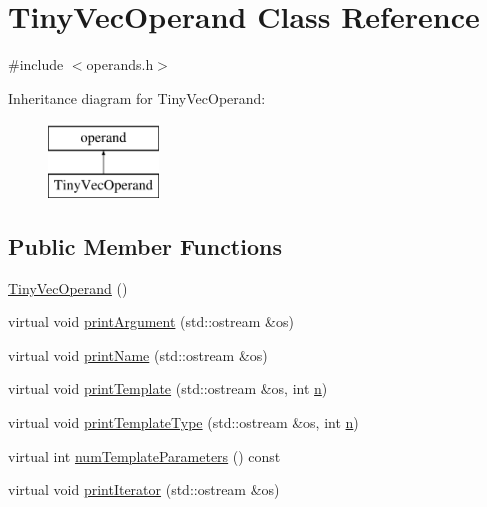 \hypertarget{classTinyVecOperand}{}\section{Tiny\+Vec\+Operand Class Reference}
\label{classTinyVecOperand}


{\ttfamily \#include $<$operands.\+h$>$}

Inheritance diagram for Tiny\+Vec\+Operand\+:\begin{figure}[H]
\begin{center}
\leavevmode
\includegraphics[height=2.000000cm]{classTinyVecOperand}
\end{center}
\end{figure}
\subsection*{Public Member Functions}
\begin{DoxyCompactItemize}
\item 
\hyperlink{classTinyVecOperand_aa486b38bca61434eaea6b1c0a2bb2fba}{Tiny\+Vec\+Operand} ()
\item 
virtual void \hyperlink{classTinyVecOperand_a8b207f9cefdae0ef7324d96a565d52cf}{print\+Argument} (std\+::ostream \&os)
\item 
virtual void \hyperlink{classTinyVecOperand_a86b2787ecac31739ef93ca8333f431fd}{print\+Name} (std\+::ostream \&os)
\item 
virtual void \hyperlink{classTinyVecOperand_a7781d884e2997fbfab85c929153972d6}{print\+Template} (std\+::ostream \&os, int \hyperlink{indexexpr_8h_ab427e2e2b4d6cec55fa088ea2a692ace}{n})
\item 
virtual void \hyperlink{classTinyVecOperand_a1fd654cccd16fefd367aecc99d049ad9}{print\+Template\+Type} (std\+::ostream \&os, int \hyperlink{indexexpr_8h_ab427e2e2b4d6cec55fa088ea2a692ace}{n})
\item 
virtual int \hyperlink{classTinyVecOperand_a19160636dfba75e8a6eee73718645365}{num\+Template\+Parameters} () const 
\item 
virtual void \hyperlink{classTinyVecOperand_aac5852d3dd202a38ce73aafcd4da7cff}{print\+Iterator} (std\+::ostream \&os)
\end{DoxyCompactItemize}
